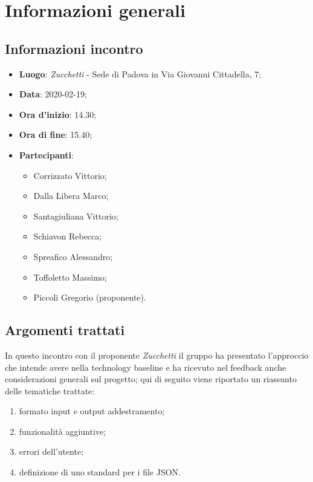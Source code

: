 \section{Informazioni generali}
    \subsection{Informazioni incontro}
        \begin{itemize}
            \item \textbf{Luogo}: \textit{Zucchetti} - Sede di Padova in Via Giovanni Cittadella, 7;
            \item \textbf{Data}: 2020-02-19;
            \item \textbf{Ora d'inizio}: 14.30;
            \item \textbf{Ora di fine}: 15.40;
            \item \textbf{Partecipanti}: 
            \begin{itemize}
                \item Corrizzato Vittorio;
                \item Dalla Libera Marco;
                \item Santagiuliana Vittorio;
                \item Schiavon Rebecca;
                \item Spreafico Alessandro;
                \item Toffoletto Massimo;
                \item Piccoli Gregorio (proponente).
            \end{itemize}
        \end{itemize}
    \subsection{Argomenti trattati}
        In questo incontro con il proponente \textit{Zucchetti} il gruppo ha presentato l'approccio che intende avere nella technology baseline e ha ricevuto nel feedback anche considerazioni generali sul progetto\glo; qui di seguito viene riportato un riassunto delle tematiche trattate:
        \begin{enumerate}
            \item formato input e output addestramento;
            \item funzionalità aggiuntive;
            \item errori dell'utente;
            \item definizione di uno standard per i file JSON.
        \end{enumerate}
